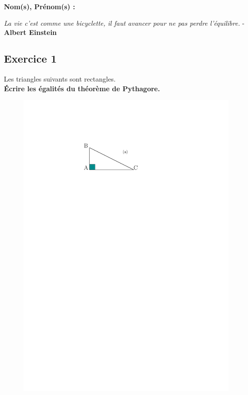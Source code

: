 \documentclass[12pt]{article}
\begin{document}

\textbf{Nom(s), Prénom(s) :}

\begin{center}
\textit{La vie c'est comme une bicyclette, il faut avancer pour ne pas perdre l'équilibre.} - \textbf{Albert Einstein}
\end{center}

\begin{multicols}{3}

  \subsection*{Exercice 1}
  Les triangles suivants sont rectangles.\\
  \textbf{Écrire les égalités du théorème de Pythagore.}

  \begin{figure}[H]
    \centering
    \includegraphics[width=0.7\linewidth]{sources/1/exo1-tri-1.pdf}
  \end{figure}


\end{multicols}
\end{document}
